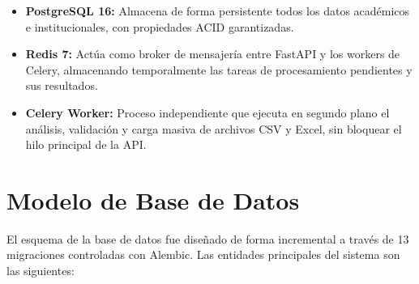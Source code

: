 \begin{itemize}
    \item \textbf{PostgreSQL 16:} Almacena de forma persistente todos los datos académicos e institucionales, con propiedades ACID garantizadas.
    \item \textbf{Redis 7:} Actúa como broker de mensajería entre FastAPI y los workers de Celery, almacenando temporalmente las tareas de procesamiento pendientes y sus resultados.
    \item \textbf{Celery Worker:} Proceso independiente que ejecuta en segundo plano el análisis, validación y carga masiva de archivos CSV y Excel, sin bloquear el hilo principal de la API.
\end{itemize}

\section{Modelo de Base de Datos}

El esquema de la base de datos fue diseñado de forma incremental a través de 13 migraciones controladas con Alembic. Las entidades principales del sistema son las siguientes:

